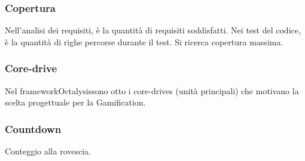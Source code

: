 \subsubsection*{Copertura}
Nell'analisi dei requisiti, è la quantità di requisiti soddisfatti. Nei test del codice, è la quantità di righe percorse durante il test. Si ricerca copertura massima.

\subsubsection*{Core-drive}
Nel framework\glosp Octalysis\glosp sono otto i core-drives (unità principali) che motivano la scelta progettuale per la Gamification\glo.

\subsubsection*{Countdown}
Conteggio alla rovescia.

